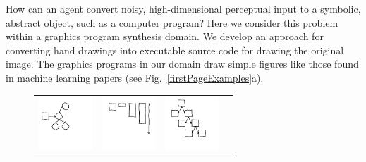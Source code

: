 \documentclass{article}
\newcommand{\exampleImageSize}{2cm}
\theoremstyle{definition}
\begin{document}
 How can an agent convert noisy, high-dimensional perceptual input
 to a symbolic, abstract object, such as a computer program?  Here we
 consider this problem within a graphics program synthesis domain.  We
 develop an approach for converting  hand
 drawings into executable source code for drawing the original image.
 The graphics programs in our domain draw simple figures like those found in
 machine learning papers (see Fig.~\ref{firstPageExamples}a).
 \begin{figure}[H]\vspace{-0.7cm}
  \begin{minipage}[t]{0.7\linewidth}  
\begin{tabular}{llll}
  \includegraphics[width = \exampleImageSize]{figures/expert-60.png}&
  \includegraphics[width = \exampleImageSize]{figures/expert-5.png}&
    \includegraphics[width = \exampleImageSize]{figures/expert-17.png}&

\end{tabular}
\end{minipage}
\end{figure}
\end{document}
